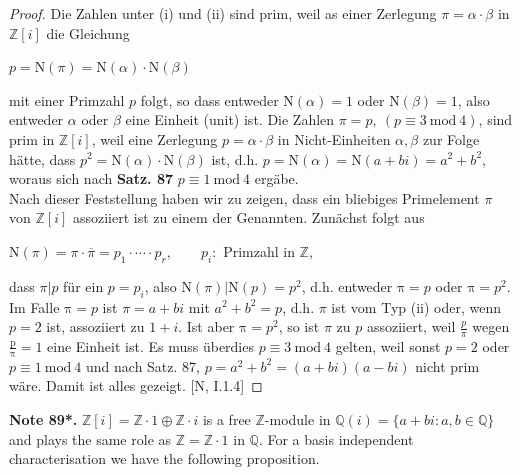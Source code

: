 \documentclass[12pt,a4paper,footinclude=true,headinclude=true]{scrbook} %
\newenvironment{nt}[2][Note]
    { \begin{mdframed}[backgroundcolor=gray!20] \textbf{#1 #2.} }
    {  \end{mdframed}}
\begin{document}
\begin{proof}
    Die Zahlen unter (i) und (ii) sind prim, weil as einer Zerlegung $\pi=\alpha\cdot\beta$ in $\mathbb{Z}[i]$ die Gleichung \\
    \centerline{$p= \mathrm{N}(\pi)=\mathrm{N}(\alpha)\cdot\mathrm{N}(\beta)$}
    mit einer Primzahl $p$ folgt, so dass entweder $\mathrm{N}(\alpha)=1$ oder $\mathrm{N}(\beta)=1$, also entweder $\alpha$ oder $\beta$ eine Einheit (unit) ist. Die Zahlen $\pi=p,\ (p\equiv3\ \mathrm{mod}\ 4)$, sind prim in $\mathbb{Z}[i]$, weil eine Zerlegung $p=\alpha\cdot\beta$ in Nicht-Einheiten $\alpha,\beta$ zur Folge h\"{a}tte, dass $p^2=\mathrm{N}(\alpha)\cdot\mathrm{N}(\beta)$ ist, d.h. $p=\mathrm{N}(\alpha)= \mathrm{N}(a+bi)=a^2+b^2$, woraus sich nach \textbf{Satz. 87} $p\equiv1\ \mathrm{mod}\ 4$ erg\"{a}be.\\
    Nach dieser Feststellung haben wir zu zeigen, dass ein bliebiges Primelement $\pi$ von $\mathbb{Z}[i]$ assoziiert ist zu einem der Genannten. Zun\"{a}chst folgt aus \\ \centerline{$\mathrm{N}(\pi)=\pi\cdot\overline{\pi}= p_1\cdot\cdots\cdot p_r,\qquad p_i:$ Primzahl in $\mathbb{Z}$,} dass $\pi|p$ f\"{u}r ein $p=p_i$, also $\mathrm{N}(\pi)|\mathrm{N}(p)=p^2$, d.h. entweder $\mathrm{\pi}=p$ oder $\mathrm{\pi}=p^2$. Im Falle $\mathrm{\pi}=p$ ist $\pi=a+bi$ mit $a^2+b^2=p$, d.h. $\pi$ ist vom Typ (ii) oder, wenn $p=2$ ist, assoziiert zu $1+i$. Ist aber $\mathrm{\pi}=p^2$, so ist $\pi$ zu $p$ assoziiert, weil $\frac{p}{\pi}$ wegen  $\mathrm{\frac{p}{\pi}} =1$ eine Einheit ist. Es muss \"{u}berdies $p\equiv3\ \mathrm{mod}\ 4$ gelten, weil sonst $p=2$ oder $p\equiv1\ \mathrm{mod}\ 4$ und nach Satz. 87, $p=a^2+b^2=(a+bi)(a-bi)$ nicht prim w\"{a}re. Damit ist alles gezeigt. [N, I.1.4]
\end{proof}

\begin{nt}{89*}
    $\mathbb{Z}[i]=\mathbb{Z}\cdot1\oplus\mathbb{Z}\cdot i$ is a free $\mathbb{Z}$-module in $\mathbb{Q}(i)=\{ a+bi:a,b\in\mathbb{Q}\}$ and plays the same role as $\mathbb{Z}=\mathbb{Z}\cdot1$ in $\mathbb{Q}$. For a basis independent characterisation we have the following proposition.
\end{nt}
\end{document}
